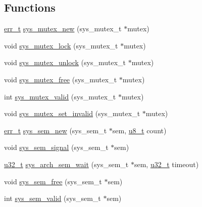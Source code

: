 \subsection*{Functions}
\begin{DoxyCompactItemize}
\item 
\hyperlink{group__infrastructure__errors_gaf02d9da80fd66b4f986d2c53d7231ddb}{err\+\_\+t} \hyperlink{group__sys__mutex_ga38e7dae1fd88b338eb1cd97f110f3897}{sys\+\_\+mutex\+\_\+new} (sys\+\_\+mutex\+\_\+t $\ast$mutex)
\item 
void \hyperlink{group__sys__mutex_ga4d4eb9afe5965fa2661dd54ff55d616a}{sys\+\_\+mutex\+\_\+lock} (sys\+\_\+mutex\+\_\+t $\ast$mutex)
\item 
void \hyperlink{group__sys__mutex_ga5568f68898fe9d5735f9ce2f665624fb}{sys\+\_\+mutex\+\_\+unlock} (sys\+\_\+mutex\+\_\+t $\ast$mutex)
\item 
void \hyperlink{group__sys__mutex_ga16336ce68b741e98204102ca4bc84dd9}{sys\+\_\+mutex\+\_\+free} (sys\+\_\+mutex\+\_\+t $\ast$mutex)
\item 
int \hyperlink{group__sys__mutex_gaebe83ba90a6d9c23cdb3eb5d49562c4a}{sys\+\_\+mutex\+\_\+valid} (sys\+\_\+mutex\+\_\+t $\ast$mutex)
\item 
void \hyperlink{group__sys__mutex_ga3f392725971dc837aa56dd7e45fa7ca8}{sys\+\_\+mutex\+\_\+set\+\_\+invalid} (sys\+\_\+mutex\+\_\+t $\ast$mutex)
\item 
\hyperlink{group__infrastructure__errors_gaf02d9da80fd66b4f986d2c53d7231ddb}{err\+\_\+t} \hyperlink{group__sys__sem_gaf99da9e34a71855285c535183133dfde}{sys\+\_\+sem\+\_\+new} (sys\+\_\+sem\+\_\+t $\ast$sem, \hyperlink{group__compiler__abstraction_ga4caecabca98b43919dd11be1c0d4cd8e}{u8\+\_\+t} count)
\item 
void \hyperlink{group__sys__sem_gaaf800273061fcc3f8200fd4e1b9ca875}{sys\+\_\+sem\+\_\+signal} (sys\+\_\+sem\+\_\+t $\ast$sem)
\item 
\hyperlink{group__compiler__abstraction_ga4c14294869aceba3ef9d4c0c302d0f33}{u32\+\_\+t} \hyperlink{group__sys__sem_ga8d364c5037778acb21c3df675db81b4f}{sys\+\_\+arch\+\_\+sem\+\_\+wait} (sys\+\_\+sem\+\_\+t $\ast$sem, \hyperlink{group__compiler__abstraction_ga4c14294869aceba3ef9d4c0c302d0f33}{u32\+\_\+t} timeout)
\item 
void \hyperlink{group__sys__sem_ga83b781f96c30e915c752065a757da283}{sys\+\_\+sem\+\_\+free} (sys\+\_\+sem\+\_\+t $\ast$sem)
\item 
int \hyperlink{group__sys__sem_ga09a6c052ddaf799139efc56adfa087e4}{sys\+\_\+sem\+\_\+valid} (sys\+\_\+sem\+\_\+t $\ast$sem)

\end{DoxyCompactItemize}
